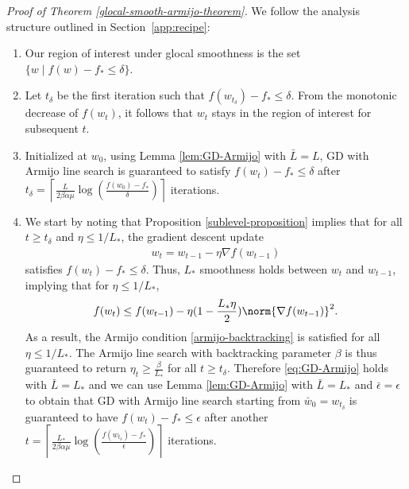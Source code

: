 \documentclass[10pt]{article} %
\newif\ifextended
\begin{document}

\ifextended
\fi
\begin{proof}[Proof of Theorem \ref{glocal-smooth-armijo-theorem}]
We follow the analysis structure outlined in Section~\ref{app:recipe}:
    \begin{enumerate}
    \item Our region of interest under glocal smoothness is the set $\{w \; \vert \;  f(w) - f_* \leq \delta \}$.
    \item Let $t_\delta$ be the first iteration such that $f(w_{t_\delta}) - f_* \leq \delta$. From the monotonic decrease of $f(w_t)$, it follows that $w_t$ stays in the region of interest for subsequent $t$.
    \item Initialized at $w_0$, using Lemma \ref{lem:GD-Armijo} with $\bar{L} = L$, GD with Armijo line search is guaranteed to satisfy $f(w_t) - f_{*} \leq \delta$ after $t_\delta = \left\lceil \frac{L}{2\beta\alpha\mu}\log\left(\frac{f(w_0) - f_*}{\delta}\right) \right\rceil$ iterations.
    \item We start by noting that Proposition \ref{sublevel-proposition} implies that for all $t \geq t_\delta$ and $\eta \leq 1 / L_*$, the gradient descent update 
    \begin{align*}
        w_{t} = w_{t-1} - \eta \nabla f(w_{t-1})
    \end{align*}
    satisfies $f(w_{t}) - f_* \leq \delta$. Thus, $L_*$ smoothness holds between $w_{t}$ and $w_{t-1}$, implying that for $\eta \leq 1 / L_*$,
    \begin{align*}
        f(w_{t}) \leq f(w_{t-1}) - \eta(1 - \frac{L_*\eta}{2})\norm{\nabla f(w_{t-1})}^2.
    \end{align*}
    As a result, the Armijo condition \cref{armijo-backtracking} is satisfied for all $\eta \leq 1 / L_*$. The Armijo line search with backtracking parameter $\beta$ is thus guaranteed to return $\eta_t \geq \frac{\beta}{L_*}$ for all $t \geq t_{\delta}$. Therefore \ref{eq:GD-Armijo} holds with $\bar{L} = L_{*}$ and we can use Lemma \ref{lem:GD-Armijo} with $\bar{L} = L_{*}$ and $\bar{\epsilon}=\epsilon$ to obtain that GD with Armijo line search starting from $\bar{w}_0 = w_{t_\delta}$ is guaranteed to have $f(w_t) - f_{*} \leq \epsilon$ after another $t = \left\lceil \frac{L_{*}}{2\beta\alpha\mu}\log\left(\frac{f(w_{t_\delta}) - f_*}{\epsilon}\right) \right\rceil$ iterations.
                  

\end{enumerate}
\end{proof}
\end{document}
